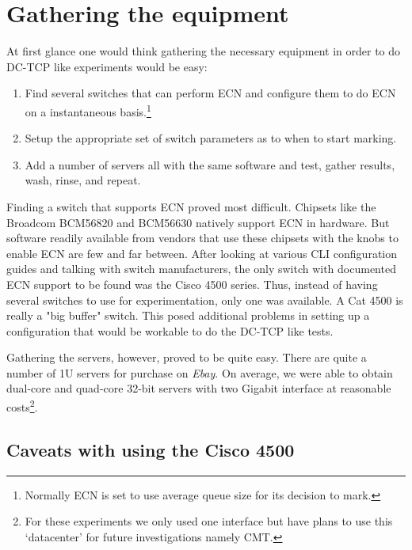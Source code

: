 \documentclass[12pt]{article}
\begin{document}
\section{Gathering the equipment}

At first glance one would think gathering the necessary equipment in order to do DC-TCP like
experiments would be easy:
\begin{enumerate}
\item Find several switches that can perform ECN and configure them
to do ECN on a instantaneous basis.\footnote{Normally ECN is set to use average queue size
for its decision to mark.}

\item Setup the appropriate set of switch parameters as to when to start
marking. 

\item Add a number of servers all with the same software and test, gather results, wash, rinse, and repeat.
\end{enumerate}

Finding a switch that supports ECN proved most difficult.  
Chipsets like the Broadcom BCM56820 and BCM56630 natively support 
ECN in hardware. But software readily available from vendors that use these chipsets with
the knobs to enable ECN are few and far between. After looking at various CLI
configuration guides and talking with switch manufacturers, the only switch with documented
ECN support to be found was the Cisco 4500 series. Thus, instead of having several switches
to use for experimentation, only one was available. A Cat 4500 is really a "big buffer"
switch. This posed additional problems in setting up a configuration that would be workable
to do the DC-TCP like tests.

Gathering the servers, however, proved to be quite easy. There are quite a number of 1U servers
for purchase on \emph{Ebay}. On average, we were able to obtain dual-core and quad-core 32-bit 
servers with two Gigabit interface at reasonable costs\footnote{For these experiments we only used
one interface but have plans to use this `datacenter' for future investigations  namely CMT.}. 



\subsection{Caveats with using the Cisco 4500}
\end{document}
